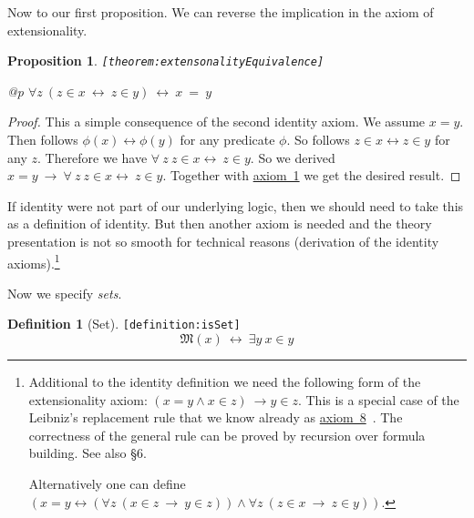 \documentclass[a4paper,german,10pt,twoside]{book}
\newtheorem{prop}[thm]{Proposition}
\theoremstyle{definition}
\newtheorem{defn}{Definition}
\theoremstyle{remark}
\begin{document}
\par
Now to our first proposition.
We can reverse the implication in the axiom of extensionality.

\begin{prop}
\label{theorem:extensonalityEquivalence} \hypertarget{theorem:extensonalityEquivalence}{}
{\tt \tiny [\verb]theorem:extensonalityEquivalence]]}
\mbox{}
\begin{longtable}{{@{\extracolsep{\fill}}p{\linewidth}}}
\centering $\forall z\ (z \in x\ \leftrightarrow\ z \in y)\ \leftrightarrow\ x \ = \ y$
\end{longtable}

\end{prop}
\begin{proof}
This a simple consequence of the second identity axiom. We assume $x=y$. Then follows $\phi(x) \leftrightarrow \phi(y)$ for any predicate $\phi$. So follows $z \in x \leftrightarrow z \in y$ for any $z$. Therefore we have $\forall \ z \ z  \in x \leftrightarrow \ z \in y$. So we derived $x = y \ \rightarrow \ \forall \ z \ z  \in x \leftrightarrow \ z \in y$. Together with \hyperlink{axiom:extensionality}{axiom~1} we get the desired result.
\end{proof}

If identity were not part of our underlying logic, then we should need to take this as a definition of identity. But then another axiom is needed and the theory presentation is not so smooth for technical reasons (derivation of the identity axioms).\footnote{
  Additional to the identity definition we need the following form of the extensionality axiom: $(x = y \land x \in z) \ \rightarrow y \in z$. This is a special case of the Leibniz's replacement rule that we know already as \hyperref{http://www.qedeq.org/0_04_07/doc/math/qedeq_logic_v1_en.pdf}{}{axiom:leibnizReplacement}{axiom~8}~\cite{l}. The correctness of the general rule can be proved by recursion over formula building. See also \cite{schmidt} \S 6.
  
  \par
  Alternatively one can define $(x = y \leftrightarrow (\forall z \ (x \in z \ \rightarrow \ y \in z)) \land \forall z \ (z \in x \ \rightarrow \ z \in y))$.}


\par
Now we specify \emph{sets}.

\begin{defn}[Set]
\label{definition:isSet} \hypertarget{definition:isSet}{}
{\tt \tiny [\verb]definition:isSet]]}
$$\mathfrak{M}(x)\ \leftrightarrow\ \exists y\ x \in y$$

\end{defn}
\end{document}
